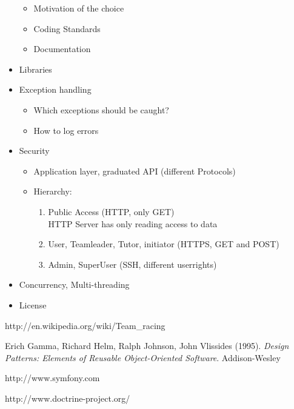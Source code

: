 \documentclass[11pt]{article}
\begin{document}
\begin{itemize}
\begin{itemize}
		\item Motivation of the choice
		\item Coding Standards
		\item Documentation
		\end{itemize}
	\item Libraries
	\item Exception handling
		\begin{itemize}
		\item Which exceptions should be caught?
		\item How to log errors
		\end{itemize}
	\item Security
		\begin{itemize}
		\item Application layer, graduated API (different Protocols)
		\item Hierarchy:
			\begin{enumerate}
			\item Public Access (HTTP, only GET)
			\\HTTP Server has only reading access to data
			\item User, Teamleader, Tutor, initiator (HTTPS, GET and POST)
			\item Admin, SuperUser (SSH, different userrights)
			\end{enumerate}
		\end{itemize}
	\item Concurrency, Multi-threading
	\item License
	\end{itemize}



\begin{thebibliography}{9}

http://en.wikipedia.org/wiki/Team\_racing
  
Erich Gamma, Richard Helm, Ralph Johnson, John Vlissides (1995).
\emph{Design Patterns: Elements of Reusable Object-Oriented Software}.
Addison-Wesley
  
http://www.symfony.com

http://www.doctrine-project.org/

\end{thebibliography}
\end{document}
